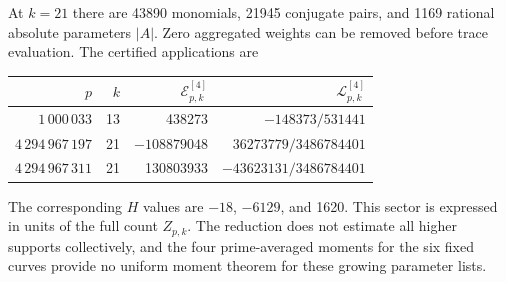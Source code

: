 \documentclass[11pt]{article}
\theoremstyle{definition}\newtheorem{definition}[theorem]{Definition}
\begin{document}
At $k=21$ there are 43890 monomials, 21945
conjugate pairs, and 1169 rational absolute
parameters $|A|$. Zero aggregated weights
can be removed before trace evaluation.
The certified applications are
\begin{center}
\begin{tabular}{r r r r}
\toprule
$p$&$k$&$\mathcal E^{[4]}_{p,k}$&$\mathcal L^{[4]}_{p,k}$\\
\midrule
$1\,000\,033$&13&438273&$-148373/531441$\\
$4\,294\,967\,197$&21&$-108879048$&$36273779/3486784401$\\
$4\,294\,967\,311$&21&130803933&$-43623131/3486784401$\\
\bottomrule
\end{tabular}
\end{center}
The corresponding $H$ values are $-18$, $-6129$,
and 1620. This sector is expressed in units
of the full count $Z_{p,k}$.
The reduction does not estimate all higher
supports collectively, and the four prime-averaged
moments for the six fixed curves provide no
uniform moment theorem for these growing
parameter lists.
\end{document}
